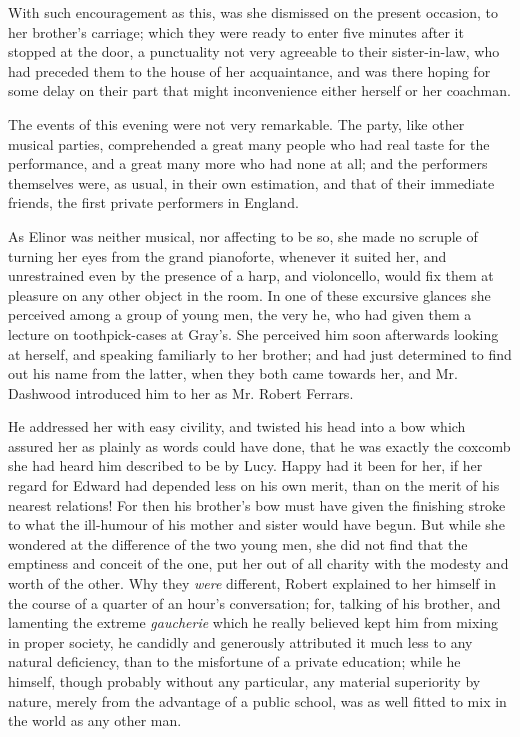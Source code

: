 With such encouragement as this, was she dismissed on the present occasion, to her brother's carriage; which they were ready to enter five minutes after it stopped at the door, a punctuality not very agreeable to their sister-in-law, who had preceded them to the house of her acquaintance, and was there hoping for some delay on their part that might inconvenience either herself or her coachman.

The events of this evening were not very remarkable. The party, like other musical parties, comprehended a great many people who had real taste for the performance, and a great many more who had none at all; and the performers themselves were, as usual, in their own estimation, and that of their immediate friends, the first private performers in England.

As Elinor was neither musical, nor affecting to be so, she made no scruple of turning her eyes from the grand pianoforte, whenever it suited her, and unrestrained even by the presence of a harp, and violoncello, would fix them at pleasure on any other object in the room. In one of these excursive glances she perceived among a group of young men, the very he, who had given them a lecture on toothpick-cases at Gray's. She perceived him soon afterwards looking at herself, and speaking familiarly to her brother; and had just determined to find out his name from the latter, when they both came towards her, and Mr. Dashwood introduced him to her as Mr. Robert Ferrars.

He addressed her with easy civility, and twisted his head into a bow which assured her as plainly as words could have done, that he was exactly the coxcomb she had heard him described to be by Lucy. Happy had it been for her, if her regard for Edward had depended less on his own merit, than on the merit of his nearest relations! For then his brother's bow must have given the finishing stroke to what the ill-humour of his mother and sister would have begun. But while she wondered at the difference of the two young men, she did not find that the emptiness and conceit of the one, put her out of all charity with the modesty and worth of the other. Why they {\em were} different, Robert explained to her himself in the course of a quarter of an hour's conversation; for, talking of his brother, and lamenting the extreme {\em gaucherie} which he really believed kept him from mixing in proper society, he candidly and generously attributed it much less to any natural deficiency, than to the misfortune of a private education; while he himself, though probably without any particular, any material superiority by nature, merely from the advantage of a public school, was as well fitted to mix in the world as any other man.


